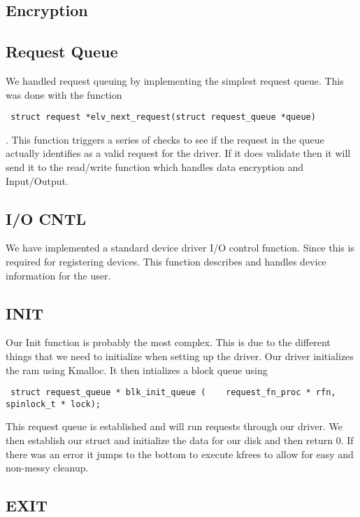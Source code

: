 \documentclass[onecolumn, draftclsnofoot,10pt, compsoc]{IEEEtran}
\begin{document}
    \subsection{Encryption}
    
    \subsection{Request Queue}
    We handled request queuing by implementing the simplest request queue. This was done with the function \begin{verbatim} struct request *elv_next_request(struct request_queue *queue) \end{verbatim}. This function triggers a series of checks to see if the request in the queue actually identifies as a valid request for the driver. If it does validate then it will send it to the read/write function which handles data encryption and Input/Output.
	\subsection{I/O CNTL}
	We have implemented a standard device driver I/O control function. Since this is required for registering devices. This function describes and handles device information for the user.
    
	\subsection{INIT}
    Our Init function is probably the most complex. This is due to the different things that we need to initialize when setting up the driver. Our driver initializes the ram using Kmalloc. It then intializes a block queue using \begin{verbatim} struct request_queue * blk_init_queue (	request_fn_proc * rfn, spinlock_t * lock); \end{verbatim} This request queue is established and will run requests through our driver. We then establish our struct and initialize the data for our disk and then return 0. If there was an error it jumps to the bottom to execute kfrees to allow for easy and non-messy cleanup.
    
    \subsection{EXIT}
    
\end{document}
